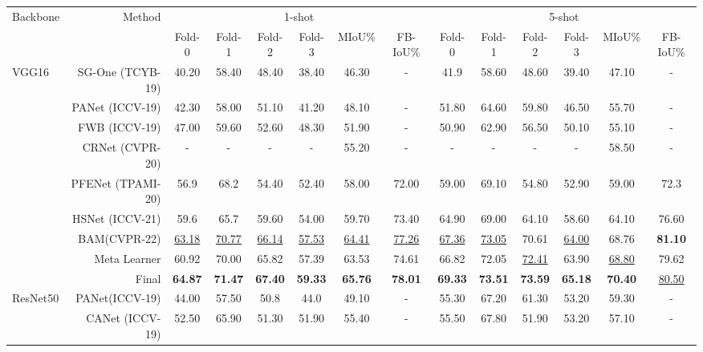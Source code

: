 \documentclass[10pt,twocolumn,letterpaper]{article}
\begin{document}
\begin{table*}[t]
\centering
\begin{adjustbox}{width=1\textwidth}
\small
\begin{tabular}{l r| c c c c c c| c c c c c c}
\midrule
\multirow{2}{*}{Backbone} & \multirow{2}{*}{Method} & \multicolumn{6}{c|}{1-shot} & \multicolumn{6}{c}{5-shot}\\
&&Fold-0 & Fold-1 & Fold-2 & Fold-3 & MIoU\% & FB-IoU\% & Fold-0 & Fold-1 & Fold-2 & Fold-3 & MIoU\% & FB-IoU\%\\\midrule
\multirow{9}{*}{VGG16} & SG-One (TCYB-19) \cite{FSS19sg} & 40.20 & 58.40 & 48.40 & 38.40 & 46.30 & - & 41.9 & 58.60 & 48.60 & 39.40 & 47.10 & -\\
&PANet (ICCV-19) \cite{FSS18panet} & 42.30 & 58.00 & 51.10 & 41.20 & 48.10 & - & 51.80 & 64.60 & 59.80 & 46.50 & 55.70 & -\\
&FWB (ICCV-19) \cite{coco20} & 47.00 & 59.60 & 52.60 & 48.30 & 51.90 & - & 50.90 & 62.90 & 56.50 & 50.10 & 55.10 & -\\
&CRNet (CVPR-20)\cite{FSS6crnet} & - & - & - & - & 55.20 & - & - & - & - & - & 58.50 & -\\
&PFENet (TPAMI-20) \cite{FSS2PFE} & 56.9 & 68.2 & 54.40 & 52.40 & 58.00 & 72.00 & 59.00 & 69.10 & 54.80 & 52.90 & 59.00 & 72.3\\
&HSNet (ICCV-21) \cite{FSS9Hsnet} & 59.6 & 65.7 & 59.60 & 54.00 & 59.70 & 73.40 & 64.90 & 69.00 & 64.10 & 58.60 & 64.10 & 76.60\\
&BAM(CVPR-22) \cite{BAM} & \underline{63.18} & \underline{70.77} & \underline{66.14} & \underline{57.53} & \underline{64.41} & \underline{77.26} & \underline{67.36} & \underline{73.05} & 70.61 & \underline{64.00} & 68.76 & \textbf{81.10}\\
\cline{2-14}
&Meta Learner & 60.92 & 70.00 & 65.82 & 57.39 & 63.53 & 74.61& 66.82 & 72.05 & \underline{72.41} & 63.90 & \underline{68.80} & 79.62\\
\rowcolor{lightgray}
\cellcolor[HTML]{FFFFFF} &Final & \textbf{64.87} & \textbf{71.47} & \textbf{67.40} & \textbf{59.33} & \textbf{65.76} & \textbf{78.01} & \textbf{69.33} & \textbf{73.51} & \textbf{73.59} & \textbf{65.18} & \textbf{70.40} & \underline{80.50}\\\midrule
\multirow{11}{*}{ResNet50} & PANet(ICCV-19) \cite{FSS18panet} & 44.00 & 57.50 & 50.8 & 44.0 & 49.10 & - & 55.30 & 67.20 & 61.30 & 53.20 & 59.30 & -\\
&CANet (ICCV-19) \cite{FSS21canet} & 52.50 & 65.90 & 51.30 & 51.90 & 55.40 & - & 55.50 & 67.80 & 51.90 & 53.20 & 57.10 & -\\

\end{tabular}
\end{adjustbox}
\end{table*}
\end{document}
